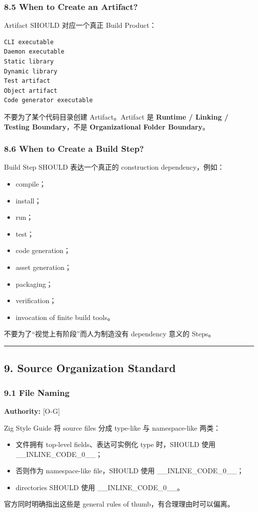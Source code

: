 \documentclass[11pt,a4paper]{article}
\begin{document}
\subsubsection{8.5 When to Create an Artifact?}
Artifact SHOULD 对应一个真正 Build Product：

\begin{lstlisting}[language=text]
CLI executable
Daemon executable
Static library
Dynamic library
Test artifact
Object artifact
Code generator executable
\end{lstlisting}
不要为了某个代码目录创建 Artifact。Artifact 是 \textbf{Runtime / Linking / Testing Boundary}，不是 \textbf{Organizational Folder Boundary}。

\subsubsection{8.6 When to Create a Build Step?}
Build Step SHOULD 表达一个真正的 construction dependency，例如：

\begin{itemize}
  \item compile；
  \item install；
  \item run；
  \item test；
  \item code generation；
  \item asset generation；
  \item packaging；
  \item verification；
  \item invocation of finite build tools。
\end{itemize}
不要为了“视觉上有阶段”而人为制造没有 dependency 意义的 Steps。

\vspace{0.5em}\hrule\vspace{0.5em}
\subsection{9. Source Organization Standard}
\subsubsection{9.1 File Naming}
\textbf{Authority:} [O-G]

Zig Style Guide 将 source files 分成 type-like 与 namespace-like 两类：

\begin{itemize}
  \item 文件拥有 top-level fields、表达可实例化 type 时，SHOULD 使用 \_\_INLINE\_CODE\_0\_\_；
  \item 否则作为 namespace-like file，SHOULD 使用 \_\_INLINE\_CODE\_0\_\_；
  \item directories SHOULD 使用 \_\_INLINE\_CODE\_0\_\_。
\end{itemize}
官方同时明确指出这些是 general rules of thumb，有合理理由时可以偏离。
\end{document}
